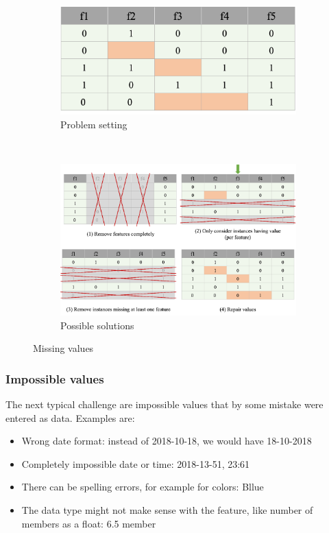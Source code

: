 \begin{figure}[h]
  \centering
  \begin{subfigure}{0.4\textwidth}
    \includegraphics[width=\linewidth]{assets/visualization_and_extraction/problem_missing_values.png}
    \caption{Problem setting}
  \end{subfigure}\\
  \vspace*{0.5cm}
  \begin{subfigure}{0.7\textwidth}
    \includegraphics[width=\linewidth]{assets/visualization_and_extraction/solution_missing_values.png}
    \caption{Possible solutions}
  \end{subfigure}
  \caption{Missing values}
  \label{fig:2_missing_values}
\end{figure}

\subsubsection*{Impossible values}
The next typical challenge are impossible values that by some mistake were entered as data. Examples are:
\begin{itemize}
  \item Wrong date format: instead of \textcolor{mathblue}{2018-10-18}, we would have \textcolor{mathblue}{18-10-2018}
  \item Completely impossible date or time: \textcolor{mathblue}{2018-13-51}, \textcolor{mathblue}{23:61}
  \item There can be spelling errors, for example for colors: \textcolor{mathblue}{Bllue}
  \item The data type might not make sense with the feature, like number of members as a float: \textcolor{mathblue}{6.5 member}
\end{itemize}

